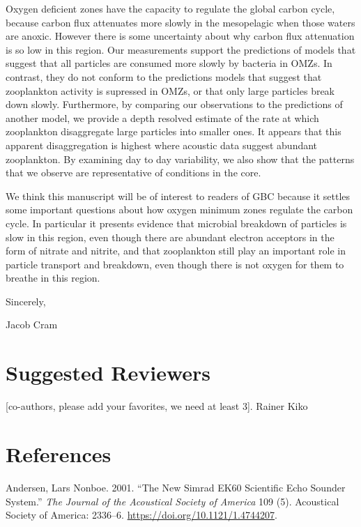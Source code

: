 \documentclass[]{article}
\begin{document}
Oxygen deficient zones have the capacity to regulate the global carbon
cycle, because carbon flux attenuates more slowly in the mesopelagic
when those waters are anoxic. However there is some uncertainty about
why carbon flux attenuation is so low in this region. Our measurements
support the predictions of models that suggest that all particles are
consumed more slowly by bacteria in OMZs. In contrast, they do not
conform to the predictions models that suggest that zooplankton activity
is supressed in OMZs, or that only large particles break down slowly.
Furthermore, by comparing our observations to the predictions of another
model, we provide a depth resolved estimate of the rate at which
zooplankton disaggregate large particles into smaller ones. It appears
that this apparent disaggregation is highest where acoustic data suggest
abundant zooplankton. By examining day to day variability, we also show
that the patterns that we observe are representative of conditions in
the core.

We think this manuscript will be of interest to readers of GBC because
it settles some important questions about how oxygen minimum zones
regulate the carbon cycle. In particular it presents evidence that
microbial breakdown of particles is slow in this region, even though
there are abundant electron acceptors in the form of nitrate and
nitrite, and that zooplankton still play an important role in particle
transport and breakdown, even though there is not oxygen for them to
breathe in this region.

Sincerely,

Jacob Cram

\hypertarget{suggested-reviewers}{%
\section{Suggested Reviewers}\label{suggested-reviewers}}

{[}co-authors, please add your favorites, we need at least 3{]}. Rainer
Kiko

\hypertarget{references}{%
\section*{References}\label{references}}

\hypertarget{refs}{}
\leavevmode\hypertarget{ref-andersenNewSimradEK602001}{}%
Andersen, Lars Nonboe. 2001. ``The New Simrad EK60 Scientific Echo
Sounder System.'' \emph{The Journal of the Acoustical Society of
America} 109 (5). Acoustical Society of America: 2336--6.
\url{https://doi.org/10.1121/1.4744207}.
\end{document}
